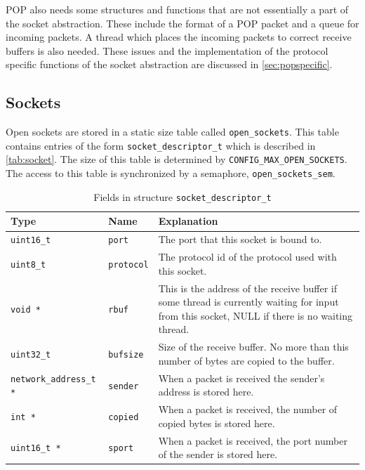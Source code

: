 \documentclass[twoside,a4paper]{report}
\newcommand{\PBS}[1]{\let\temp=\\#1\let\\=\temp}
\newlength{\tablewidth}
\newenvironment{structdescription}{%
\begin{center}%
\begin{tabular}{p{3.5cm}|p{2.5cm}|>{\PBS\raggedright}p{\tablewidth-6\tabcolsep-6cm}}%
\textbf{Type} & \textbf{Name} & \textbf{Explanation} \\ %
}{%
\end{tabular}%
\end{center}%
}
\newcommand{\structfield}[3]{%
\hline%
\texttt{#1} & \texttt{#2} & #3 \\%
}
\begin{document}
POP also needs some structures and functions that are not essentially
a part of the socket abstraction. These include the format of a POP
packet and a queue for incoming packets. A thread which places the
incoming packets to correct receive buffers is also needed. These
issues and the implementation of the protocol specific functions of
the socket abstraction are discussed in \autoref{sec:popspecific}.

\subsection{Sockets}
\label{sec:sockets}

Open sockets are stored in a static size table called
\texttt{open\_sockets}.
This table contains entries of the form \texttt{socket\_descriptor\_t}
 which is
described in \autoref{tab:socket}. The size of this table is
determined by
\texttt{CONFIG\_MAX\_OPEN\_SOCKETS}.
The access to this table is synchronized by a semaphore,
\texttt{open\_sockets\_sem}.

\begin{table}
\begin{structdescription}

\structfield{uint16\_t}{port}{The port that this socket is bound to.}

\structfield{uint8\_t}{protocol}{The protocol id of the protocol used
with this socket.}

\structfield{void *}{rbuf}{This is the address of the receive buffer
if some thread is currently waiting for input from this socket, NULL
if there is no waiting thread.}

\structfield{uint32\_t}{bufsize}{Size of the receive buffer. No
more than this number of bytes are copied to the buffer.}

\structfield{network\_address\_t *}{sender}{When a packet is received
  the sender's address is stored here.}

\structfield{int *}{copied}{When a packet is received, the number of
  copied bytes is stored here.}

\structfield{uint16\_t *}{sport}{When a packet is received, the port
  number of the sender is stored here.}

\end{structdescription}
\caption{Fields in structure \texttt{socket\_descriptor\_t}}
\label{tab:socket}
\end{table}
\end{document}
